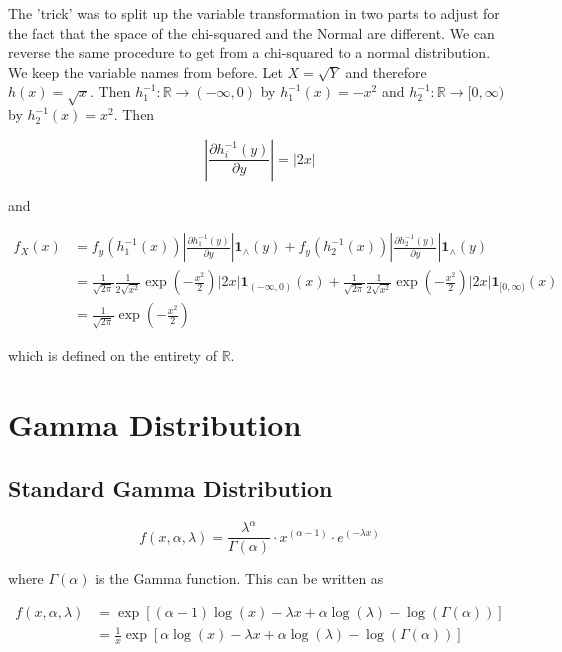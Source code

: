 \documentclass{article}
\begin{document}
The 'trick' was to split up the variable transformation in two parts to adjust for the fact that the space of the chi-squared and the Normal are different. We can reverse the same procedure to get from a chi-squared to a normal distribution. We keep the variable names from before. Let $X = \sqrt{Y}$ and therefore $h(x) = \sqrt{x}$. Then $h_1^{-1}: \mathbb{R} \rightarrow (-\infty, 0)$ by $h_1^{-1}(x) = -x^2$ and $h_2^{-1}: \mathbb{R} \rightarrow [0, \infty)$ by $h_2^{-1}(x) = x^2$. Then

$$\left\vert\frac{\partial h_i^{-1}(y)}{\partial y} \right\vert = \vert 2x \vert $$

and

\begin{align}
f_X(x) &= f_y(h_1^{-1}(x)) \left\vert\frac{\partial h_1^{-1}(y)}{\partial y} \right\vert \mathbf{1}_\wedge(y) + f_y(h_2^{-1}(x)) \left\vert\frac{\partial h_2^{-1}(y)}{\partial y} \right\vert \mathbf{1}_\wedge(y) \nonumber \\
&= \frac{1}{\sqrt{2\pi}} \frac{1}{2\sqrt{x^2}} \exp(-\frac{x^2}{2}) |2x| \mathbf{1}_{(-\infty, 0)}(x) + \frac{1}{\sqrt{2\pi}} \frac{1}{2\sqrt{x^2}} \exp(-\frac{x^2}{2}) |2x| \mathbf{1}_{[0, \infty)}(x) \\
&= \frac{1}{\sqrt{2\pi}} \exp(-\frac{x^2}{2}) \nonumber
\end{align}

which is defined on the entirety of $\mathbb{R}$.

\section{Gamma Distribution}

\subsection{Standard Gamma Distribution}

\begin{equation}
f(x, \alpha, \lambda) = \frac{\lambda^\alpha}{\Gamma(\alpha)} \cdot x^{(\alpha - 1)} \cdot e^{(-\lambda x)}
\label{eq:gamma_pdf}
\end{equation}

where $\Gamma(\alpha)$ is the Gamma function. This can be written as

\begin{align}
f(x, \alpha, \lambda) &= \exp \left[(\alpha -1)\log(x) - \lambda x + \alpha \log(\lambda) - \log(\Gamma(\alpha))\right] \\
&= \frac{1}{x} \exp\left[\alpha\log(x) - \lambda x + \alpha \log(\lambda) - \log(\Gamma(\alpha))\right]
\label{eq:gamma_exp_family}
\end{align}
\end{document}
